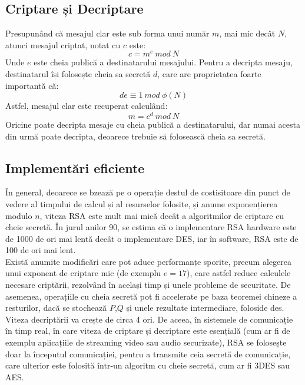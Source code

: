 \documentclass[12]{article}
\begin{document}
\subsection{Criptare și Decriptare}
Presupunând că mesajul clar este sub forma unui număr $m$, mai mic decât $N$, atunci mesajul criptat, notat cu $c$ este:
$$c = m^e \ mod \ N$$
Unde $e$ este cheia publică a destinatarului mesajului. Pentru a decripta mesaju, destinatarul își folosește cheia sa secretă $d$, care are proprietatea foarte importantă că:
$$de \equiv 1 \ mod \ \phi(N)$$
Astfel, mesajul clar este recuperat calculând:
$$m = c^d \ mod \ N$$
Oricine poate decripta mesaje cu cheia publică a destinatarului, dar numai acesta din urmă poate decripta, deoarece trebuie să folosească cheia sa secretă.
\subsection{Implementări eficiente}
În general, deoarece se bzează pe o operație destul de costisitoare din punct de vedere al timpului de calcul și al resurselor folosite, și anume exponențierea modulo $n$, viteza RSA este mult mai mică decât a algoritmilor de criptare cu cheie secretă. În jurul anilor 90, se estima că o implementare RSA hardware este de 1000 de ori mai lentă decât o implementare DES, iar în software, RSA este de 100 de ori mai lent. \\
Există anumite modificări care pot aduce performanțe sporite, precum alegerea unui exponent de criptare mic (de exemplu $e=17$), care astfel reduce calculele necesare criptării, rezolvând în același timp și unele probleme de securitate. De asemenea, operațiile cu cheia secretă pot fi accelerate pe baza teoremei chineze a resturilor, dacă se stochează $P$,$Q$ și unele rezultate intermediare, foloside des.  Viteza decriptării va crește de circa 4 ori. De aceea, în sistemele de comunicație în timp real, în care viteza de criptare și decriptare este esențială (cum ar fi de exemplu aplicațiile de streaming video sau audio securizate), RSA se folosește doar la începutul comunicației, pentru a transmite ceia secretă de comunicație, care ulterior este folosită într-un algoritm cu cheie secretă, cum ar fi 3DES sau AES.
\end{document}
